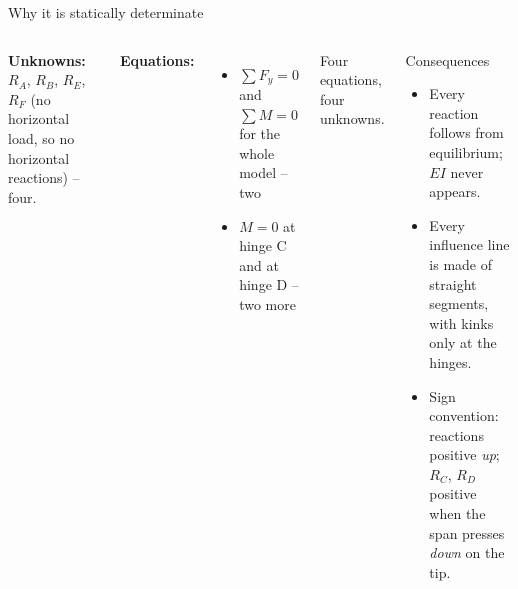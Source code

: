 \documentclass[aspectratio=169,11pt]{beamer}
\begin{document}
\begin{frame}{Why it is statically determinate}
\begin{columns}[T]
\textbf{Unknowns:} $R_A$, $R_B$, $R_E$, $R_F$ (no horizontal load, so no horizontal reactions) -- four.
\medskip

\textbf{Equations:}
\begin{itemize}
  \item $\sum F_y = 0$ and $\sum M = 0$ for the whole model -- two
  \item $M = 0$ at hinge C and at hinge D -- two more
\end{itemize}
Four equations, four unknowns.
\begin{block}{Consequences}
\begin{itemize}
  \item Every reaction follows from equilibrium; $EI$ never appears.
  \item Every influence line is made of \alert{straight segments}, with kinks only at the hinges.
  \item Sign convention: reactions positive \emph{up}; $R_C$, $R_D$ positive when the span presses \emph{down} on the tip.
\end{itemize}
\end{block}
\end{columns}
\end{frame}

\end{document}

